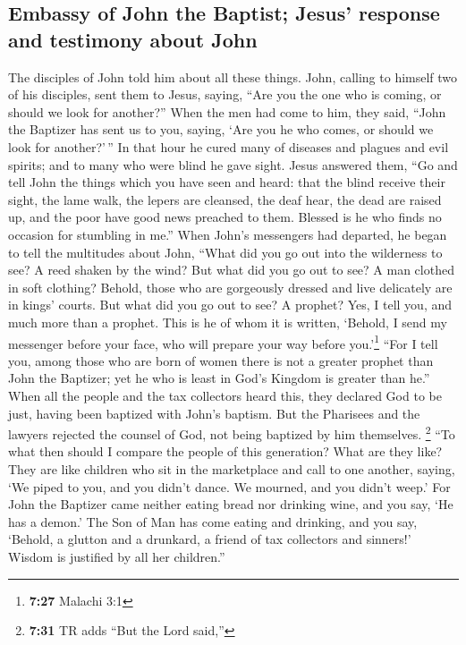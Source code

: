 \begin{paracol}{2}
\begin{otherlanguage}{english}
\hypertarget{embassy-of-john-the-baptist-jesus-response-and-testimony-about-john}{%
\subsection{Embassy of John the Baptist; Jesus' response and testimony
about
John}\label{embassy-of-john-the-baptist-jesus-response-and-testimony-about-john}}

 The disciples of John told him about all these things.
 John, calling to himself two of his disciples, sent them
to Jesus, saying, ``Are you the one who is coming, or should we look for
another?''  When the men had come to him, they said,
``John the Baptizer has sent us to you, saying, `Are you he who comes,
or should we look for another?'\,''  In that hour he
cured many of diseases and plagues and evil spirits; and to many who
were blind he gave sight.  Jesus answered them, ``Go and
tell John the things which you have seen and heard: that the blind
receive their sight, the lame walk, the lepers are cleansed, the deaf
hear, the dead are raised up, and the poor have good news preached to
them.  Blessed is he who finds no occasion for stumbling
in me.''  When John's messengers had departed, he began
to tell the multitudes about John, ``What did you go out into the
wilderness to see? A reed shaken by the wind?  But what
did you go out to see? A man clothed in soft clothing? Behold, those who
are gorgeously dressed and live delicately are in kings' courts.
 But what did you go out to see? A prophet? Yes, I tell
you, and much more than a prophet.  This is he of whom it
is written, `Behold, I send my messenger before your face, who will
prepare your way before you.'\footnote{\textbf{7:27} Malachi 3:1}
 ``For I tell you, among those who are born of women
there is not a greater prophet than John the Baptizer; yet he who is
least in God's Kingdom is greater than he.''  When all
the people and the tax collectors heard this, they declared God to be
just, having been baptized with John's baptism.  But the
Pharisees and the lawyers rejected the counsel of God, not being
baptized by him themselves.  \footnote{\textbf{7:31} TR
  adds ``But the Lord said,''} ``To what then should I compare the
people of this generation? What are they like?  They are
like children who sit in the marketplace and call to one another,
saying, `We piped to you, and you didn't dance. We mourned, and you
didn't weep.'  For John the Baptizer came neither eating
bread nor drinking wine, and you say, `He has a demon.' 
The Son of Man has come eating and drinking, and you say, `Behold, a
glutton and a drunkard, a friend of tax collectors and sinners!'
 Wisdom is justified by all her children.''


\end{otherlanguage}
\end{paracol}
